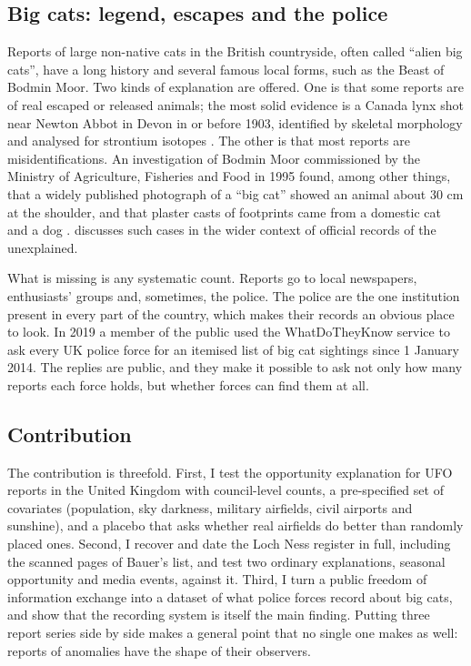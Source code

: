 \documentclass[11pt,a4paper]{article}
\begin{document}
\subsection{Big cats: legend, escapes and the police}
Reports of large non-native cats in the British countryside, often called ``alien big cats'', have a long history and several famous local forms, such as the Beast of Bodmin Moor. Two kinds of explanation are offered. One is that some reports are of real escaped or released animals; the most solid evidence is a Canada lynx shot near Newton Abbot in Devon in or before 1903, identified by skeletal morphology and analysed for strontium isotopes \citep{blake2014}. The other is that most reports are misidentifications. An investigation of Bodmin Moor commissioned by the Ministry of Agriculture, Fisheries and Food in 1995 found, among other things, that a widely published photograph of a ``big cat'' showed an animal about 30 cm at the shoulder, and that plaster casts of footprints came from a domestic cat and a dog \citep{clarke2014b}. \citet{clarke2014} discusses such cases in the wider context of official records of the unexplained.

What is missing is any systematic count. Reports go to local newspapers, enthusiasts' groups and, sometimes, the police. The police are the one institution present in every part of the country, which makes their records an obvious place to look. In 2019 a member of the public used the WhatDoTheyKnow service to ask every UK police force for an itemised list of big cat sightings since 1 January 2014. The replies are public, and they make it possible to ask not only how many reports each force holds, but whether forces can find them at all.

\subsection{Contribution}
The contribution is threefold. First, I test the opportunity explanation for UFO reports in the United Kingdom with council-level counts, a pre-specified set of covariates (population, sky darkness, military airfields, civil airports and sunshine), and a placebo that asks whether real airfields do better than randomly placed ones. Second, I recover and date the Loch Ness register in full, including the scanned pages of Bauer's list, and test two ordinary explanations, seasonal opportunity and media events, against it. Third, I turn a public freedom of information exchange into a dataset of what police forces record about big cats, and show that the recording system is itself the main finding. Putting three report series side by side makes a general point that no single one makes as well: reports of anomalies have the shape of their observers.
\end{document}

